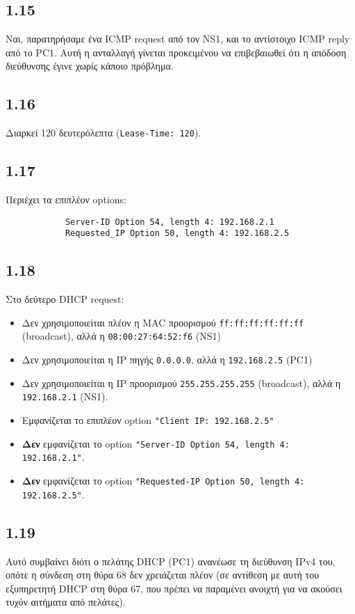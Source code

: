 \documentclass[a4paper, 12pt]{article}
\begin{document}
	\subsection*{1.15}
		Ναι, παρατηρήσαμε ένα ICMP request από τον NS1, και το αντίστοιχο ICMP reply από το PC1. Αυτή η ανταλλαγή γίνεται προκειμένου να επιβεβαιωθεί ότι η απόδοση διεύθυνσης έγινε χωρίς κάποιο πρόβλημα.
	
	\subsection*{1.16}
		Διαρκεί 120 δευτερόλεπτα (\verb|Lease-Time: 120|).
	
	\subsection*{1.17}
		Περιέχει τα επιπλέον options:
		
		\begin{verbatim}
			Server-ID Option 54, length 4: 192.168.2.1
			Requested_IP Option 50, length 4: 192.168.2.5
		\end{verbatim}
	
	\subsection*{1.18}
		Στο δεύτερο DHCP request:
		
		\begin{itemize}
			\item Δεν χρησιμοποιείται πλέον η MAC προορισμού \verb|ff:ff:ff:ff:ff:ff| (broadcast), αλλά η \verb|08:00:27:64:52:f6| (NS1)
			\item Δεν χρησιμοποιείται η IP πηγής \verb|0.0.0.0|, αλλά η \verb|192.168.2.5| (PC1)
			\item Δεν χρησιμοποιείται η IP προορισμού \verb|255.255.255.255| (broadcast), αλλά η \verb|192.168.2.1| (NS1).
			\item Εμφανίζεται το επιπλέον option \verb|"Client IP: 192.168.2.5"|
			\item \textbf{Δεν} εμφανίζεται το option \verb|"Server-ID Option 54, length 4: 192.168.2.1"|.
			\item \textbf{Δεν} εμφανίζεται το option \verb|"Requested-IP Option 50, length 4: 192.168.2.5"|.
		\end{itemize}
	
	\subsection*{1.19} 
		Αυτό συμβαίνει διότι ο πελάτης DHCP (PC1) ανανέωσε τη διεύθυνση IPv4 του, οπότε η σύνδεση στη θύρα 68 δεν χρειάζεται πλέον (σε αντίθεση με αυτή του εξυπηρετητή DHCP στη θύρα 67, που πρέπει να παραμένει ανοιχτή για να ακούσει τυχόν αιτήματα από πελάτες).
	
\end{document}
